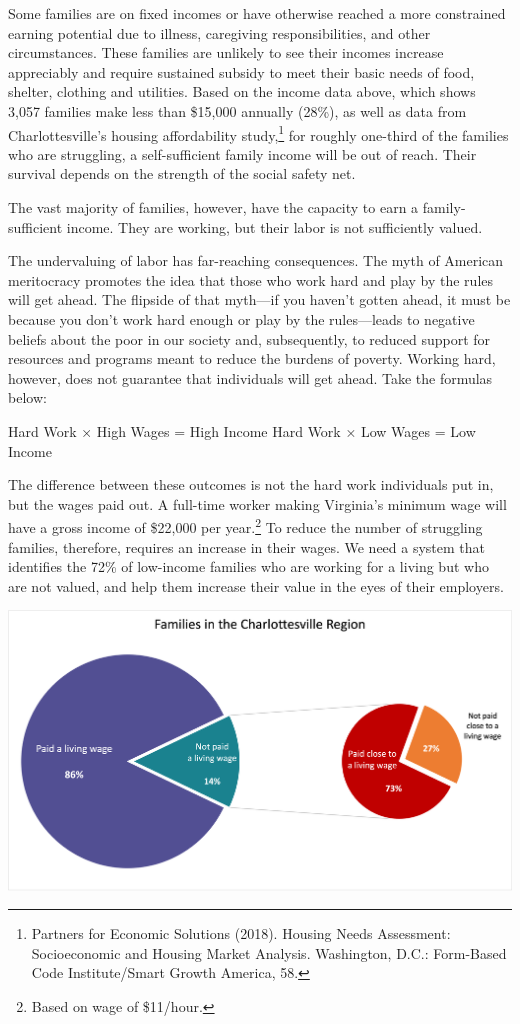 \documentclass[
]{article}
\begin{document}
Some families are on fixed incomes or have otherwise reached a more
constrained earning potential due to illness, caregiving
responsibilities, and other circumstances. These families are unlikely
to see their incomes increase appreciably and require sustained subsidy
to meet their basic needs of food, shelter, clothing and utilities.
Based on the income data above, which shows 3,057 families make less
than \$15,000 annually (28\%), as well as data from Charlottesville's
housing affordability study,\footnote{Partners for Economic Solutions
  (2018). Housing Needs Assessment: Socioeconomic and Housing Market
  Analysis. Washington, D.C.: Form-Based Code Institute/Smart Growth
  America, 58.} for roughly one-third of the families who are
struggling, a self-sufficient family income will be out of reach. Their
survival depends on the strength of the social safety net.

The vast majority of families, however, have the capacity to earn a
family-sufficient income. They are working, but their labor is not
sufficiently valued.

The undervaluing of labor has far-reaching consequences. The myth of
American meritocracy promotes the idea that those who work hard and play
by the rules will get ahead. The flipside of that myth---if you haven't
gotten ahead, it must be because you don't work hard enough or play by
the rules---leads to negative beliefs about the poor in our society and,
subsequently, to reduced support for resources and programs meant to
reduce the burdens of poverty. Working hard, however, does not guarantee
that individuals will get ahead. Take the formulas below:

Hard Work × High Wages = High Income Hard Work × Low Wages = Low Income

The difference between these outcomes is not the hard work individuals
put in, but the wages paid out. A full-time worker making Virginia's
minimum wage will have a gross income of \$22,000 per year.\footnote{Based
  on wage of \$11/hour.} To reduce the number of struggling families,
therefore, requires an increase in their wages. We need a system that
identifies the 72\% of low-income families who are working for a living
but who are not valued, and help them increase their value in the eyes
of their employers.

\begin{center}\includegraphics[width=1\linewidth]{images/PictureChart} \end{center}
\end{document}
